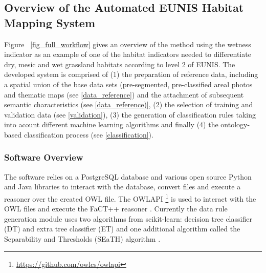 \documentclass[authoryear, review,12pt,number]{elsarticle}
\begin{document}
\subsection{Overview of the Automated EUNIS Habitat Mapping System}
 Figure ~\ref{fig_full_workflow} gives an overview of the method using the
 wetness indicator as an example of one of the habitat indicators needed to
 differentiate dry, mesic and wet grassland habitats according to level 2 of
 EUNIS. 
The developed system is comprised of (1) the preparation of reference data,
including a spatial union of the base data sets (pre-segmented,
pre-classified areal photos and thematic maps (see \ref{data_reference}) and the attachment
of subsequent semantic characteristics (see \ref{data_reference)}, (2) the
selection of training and validation data (see \ref{validation}), (3) the
generation of classification rules taking into acount different machine
learning algorithms and finally (4) the ontology-based classification process
(see \ref{classification}).
\label{subsec_software}
\subsubsection{Software Overview}
The software relies on a PostgreSQL database and various open source Python and 
Java libraries to interact with the database, convert files and execute a 
reasoner over the created OWL file.
The OWLAPI \footnote{\url{https://github.com/owlcs/owlapi}} is used to interact 
with the OWL files and execute the FaCT++
reasoner \citep{Tsarkov2006}. Currently the data rule generation module uses two 
algorithms from scikit-learn: decision tree classifier (DT) and extra tree 
classifier (ET) and one additional algorithm called the Separability and 
Thresholds (SEaTH) algorithm \citep{Nussbaum2006}. 
\end{document}

